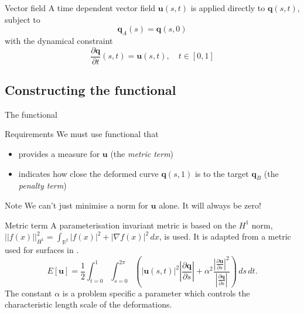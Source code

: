 \documentclass{beamer}
\newcommand{\vect}[1]{\ensuremath{\mathbf{#1}}}
\begin{document}
\begin{frame}{Vector field}
A time dependent vector field $\vect u(s,t)$ is applied directly to 
$\vect q(s,t)$, subject to
\begin{equation}
  \vect q_A(s) =\vect q(s,0)   \label{eq:template}
\end{equation}
with the dynamical constraint
\begin{equation}
  \frac{\partial \vect q}{\partial t}(s,t) = \vect u(s,t) ,\quad t \in [0,1] \label{eq:dqdt}
\end{equation}
\end{frame}

\subsection{Constructing the functional}
\begin{frame}{The functional}
  \begin{block}{Requirements}
  We must use functional that
  \begin{itemize}
  \item provides a measure for $\vect u$ (the \textit{metric term})
  \item indicates how close the deformed curve $\vect q(s,1)$ is to the target $\vect q_B$ (the \textit{penalty term})
  \end{itemize}
  \end{block}
  \begin{alertblock}{Note}
    We can't just minimise a norm for $\vect u$ alone. It will always be zero!
  \end{alertblock}
\end{frame}


\begin{frame}{Metric term}
A parameterisation invariant metric is based on the $H^1$ norm, $||f(x)||^2_{H^1} = \int_{\mathbb{R}^2} |f(x)|^2 + |\nabla f(x)|^2\,dx$, is used. It is adapted from a metric used for surfaces in \cite{bauer2011new}.
\begin{equation}
  \label{eq:metric}
  E[\vect u] = \frac{1}{2} \int^{1}_{t=0} \int^{2\pi}_{s=0}\left( \left| \vect u(s,t) \right|^2 
  \left| \frac{\partial \vect q}{\partial s} \right|  + 
  \alpha^2 \frac{ 
    \left| \frac{\partial \vect u}{\partial s}\right|^2}{
    \left| \frac{\partial \vect q}{\partial s}\right|}\right)  \,ds\,dt.
\end{equation}
The constant $\alpha$ is a problem
specific a parameter which controls the characteristic length scale of the
deformations.

\end{frame}
\end{document}
